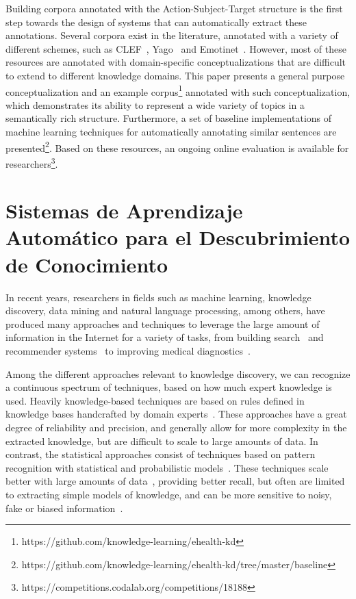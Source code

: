 Building corpora annotated with the Action-Subject-Target structure is the first step towards the design of systems that can automatically extract these annotations. Several corpora exist in the literature, annotated with a variety of different schemes, such as CLEF~\cite{kelly2016overview}, Yago~\cite{fabian2007yago} and Emotinet~\cite{emotinet}.
However, most of these resources are annotated with domain-specific conceptualizations that are difficult to extend to different knowledge domains.
This paper presents a general purpose conceptualization and an example corpus\footnote{https://github.com/knowledge-learning/ehealth-kd}
annotated with such conceptualization, which demonstrates its ability to represent a wide variety of topics in a semantically rich structure.
Furthermore, a set of baseline implementations of machine learning techniques for automatically annotating similar sentences are presented\footnote{https://github.com/knowledge-learning/ehealth-kd/tree/master/baseline}.
Based on these resources, an ongoing online evaluation is available for researchers\footnote{https://competitions.codalab.org/competitions/18188}.

  \section{Sistemas de Aprendizaje Automático para el Descubrimiento de Conocimiento}

  In recent years, researchers in fields such as machine learning, knowledge discovery, data mining and
natural language processing, among others, have produced many approaches and techniques to
leverage the large amount of information in the Internet for a variety of tasks, from
building search~\cite{google} and recommender systems~\cite{youtube}
to improving medical diagnostics~\cite{watson}.

Among the different approaches relevant to knowledge discovery, we can recognize a
continuous spectrum of techniques, based on how much expert knowledge is used.
Heavily knowledge-based techniques are based
on rules defined in knowledge bases handcrafted by domain experts~\cite{chandrasekaran1986generic}.
These approaches have a great degree
of reliability and precision, and generally allow for more complexity in the extracted knowledge,
but are difficult to scale to large amounts of data.
In contrast, the statistical approaches consist of techniques based on pattern recognition with statistical
and probabilistic models~\cite{kevin2012machine}. These techniques scale better with large amounts of data~\cite{le2013building},
providing better recall, but often are limited to extracting simple models of knowledge,
and can be more sensitive to noisy, fake or biased information~\cite{bolukbasi2016man}.

